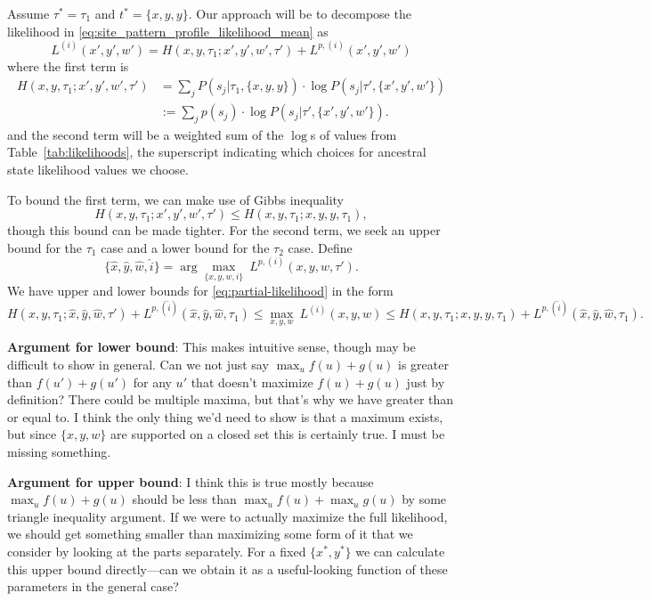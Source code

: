 \documentclass[a4paper]{article}
\begin{document}
Assume $\tau^*=\tau_1$ and $t^*=\{x,y,y\}$.
Our approach will be to decompose the likelihood in \eqref{eq:site_pattern_profile_likelihood_mean} as
\begin{equation}
\label{eq:partial-likelihood}
L^{(i)}(x', y', w') = H(x,y,\tau_1;x',y',w', \tau') + L^{p,(i)}(x',y',w')
\end{equation}
where the first term is
\begin{align}
\label{eq:information}
H(x,y,\tau_1;x',y',w',\tau') &= \sum_{j} P(s_j | \tau_1, \{x,y,y\}) \cdot \log P(s_j | \tau', \{x',y',w'\}) \nonumber \\
&:= \sum_{j} p(s_j) \cdot \log P(s_j | \tau', \{x',y',w'\}).
\end{align}
and the second term will be a weighted sum of the $\log$s of values from Table~\ref{tab:likelihoods}, the superscript indicating which choices for ancestral state likelihood values we choose.

To bound the first term, we can make use of Gibbs inequality
$$
H(x, y, \tau_1;x', y', w', \tau') \le H(x, y, \tau_1;x, y, y, \tau_1),
$$
though this bound can be made tighter.
For the second term, we seek an upper bound for the $\tau_1$ case and a lower bound for the $\tau_2$ case.
Define
$$
\{\hat{x}, \hat{y}, \hat{w}, \hat{i}\} = \arg\max_{\{x,y,w,i\}} \ L^{p,(i)}(x,y,w,\tau').
$$
We have upper and lower bounds for \eqref{eq:partial-likelihood} in the form
$$
H(x,y,\tau_1; \hat{x}, \hat{y}, \hat{w}, \tau') + L^{p,(\hat{i})}(\hat{x}, \hat{y}, \hat{w},\tau_1) \le \max_{x,y,w} \ L^{(i)}(x,y,w) \le H(x,y,\tau_1;x,y,y,\tau_1) + L^{p,(\hat{i})}(\hat{x}, \hat{y}, \hat{w},\tau_1).
$$

\textbf{Argument for lower bound}: This makes intuitive sense, though may be difficult to show in general.
Can we not just say $\max_u f(u) + g(u)$ is greater than $f(u') + g(u')$ for any $u'$ that doesn't maximize $f(u) + g(u)$ just by definition?
There could be multiple maxima, but that's why we have greater than or equal to.
I think the only thing we'd need to show is that a maximum exists, but since $\{x,y,w\}$ are supported on a closed set this is certainly true.
I must be missing something.

\textbf{Argument for upper bound}: I think this is true mostly because $\max_u f(u) + g(u)$ should be less than $\max_u f(u) + \max_u g(u)$ by some triangle inequality argument.
If we were to actually maximize the full likelihood, we should get something smaller than maximizing some form of it that we consider by looking at the parts separately.
For a fixed $\{x^*, y^*\}$ we can calculate this upper bound directly---can we obtain it as a useful-looking function of these parameters in the general case?
\end{document}
